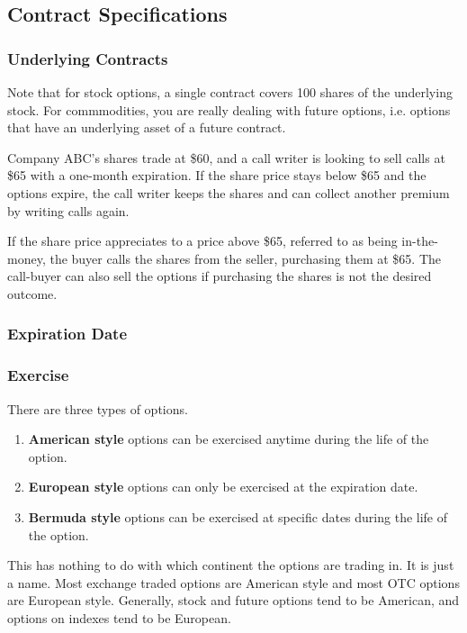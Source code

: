 \documentclass{article}
\begin{document}
  \subsection{Contract Specifications}

    \subsubsection{Underlying Contracts}

      \begin{example}[Underlying]
        Note that for stock options, a single contract covers 100 shares of the underlying stock. For commmodities, you are really dealing with future options, i.e. options that have an underlying asset of a future contract. 
      \end{example}

      \begin{example}
        Company ABC's shares trade at \$60, and a call writer is looking to sell calls at \$65 with a one-month expiration. If the share price stays below \$65 and the options expire, the call writer keeps the shares and can collect another premium by writing calls again. 

        If the share price appreciates to a price above \$65, referred to as being in-the-money, the buyer calls the shares from the seller, purchasing them at \$65. The call-buyer can also sell the options if purchasing the shares is not the desired outcome.
      \end{example}

    \subsubsection{Expiration Date}

    \subsubsection{Exercise}

      There are three types of options. 
      \begin{enumerate}
        \item \textbf{American style} options can be exercised anytime during the life of the option. 
        \item \textbf{European style} options can only be exercised at the expiration date.
        \item \textbf{Bermuda style} options can be exercised at specific dates during the life of the option.
      \end{enumerate}
      This has nothing to do with which continent the options are trading in. It is just a name. Most exchange traded options are American style and most OTC options are European style. Generally, stock and future options tend to be American, and options on indexes tend to be European. 
\end{document}

